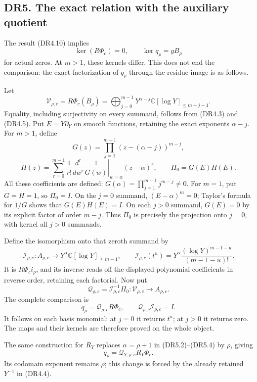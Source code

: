 \subsection{DR5. The exact relation with the auxiliary
quotient}\label{dr5.-the-exact-relation-with-the-auxiliary-quotient}

The result (DR4.10) implies \[
 \ker(R\Phi_c)=0,\qquad
 \ker q_\rho=yB_\rho
\tag{DR5.1}
\] for actual zeros. At \(m>1\), these kernels differ. This does not end
the comparison: the exact factorization of \(q_\rho\) through the
residue image is as follows.

Let \[
 \mathscr V_{\rho,c}=R\Phi_c(B_\rho)
    =\bigoplus_{j=0}^{m-1}
       Y^{\alpha-j}\mathbb C[\log Y]_{\le m-j-1}.
\tag{DR5.2}
\] Equality, including surjectivity on every summand, follows from
(DR4.3) and (DR4.5). Put \(E=Y\partial_Y\) on smooth functions,
retaining the exact exponents \(\alpha-j\). For \(m>1\), define \[
 G(z)=\prod_{j=1}^{m-1}(z-(\alpha-j))^{m-j},
\] \[
 H(z)=\sum_{r=0}^{m-1}
      \frac1{r!}\left.
          \frac{d^r}{dw^r}\frac1{G(w)}
      \right|_{w=\alpha}
      (z-\alpha)^r,\qquad
 \Pi_0=G(E)H(E).
\tag{DR5.3}
\] All these coefficients are defined: \(G(\alpha)=
\prod_{j=1}^{m-1}j^{m-j}\ne0\). For \(m=1\), put \(G=H=1\), so
\(\Pi_0=I\). On the \(j=0\) summand, \((E-\alpha)^m=0\); Taylor's
formula for \(1/G\) shows that \(G(E)H(E)=I\). On each \(j>0\) summand,
\(G(E)=0\) by its explicit factor of order \(m-j\). Thus \(\Pi_0\) is
precisely the projection onto \(j=0\), with kernel all \(j>0\) summands.

Define the isomorphism onto that zeroth summand by \[
 \mathscr I_{\rho,c}:A_{\rho,c}\longrightarrow
    Y^\alpha\mathbb C[\log Y]_{\le m-1},\qquad
 \mathscr I_{\rho,c}(t^u)
      =Y^\alpha\frac{(\log Y)^{m-1-u}}{(m-1-u)!}.
\tag{DR5.4}
\] It is \(R\Phi_c i_\rho\), and its inverse reads off the displayed
polynomial coefficients in reverse order, retaining each factorial. Now
put \[
 \mathscr Q_{\rho,c}
       =\mathscr I_{\rho,c}^{-1}\Pi_0:
       \mathscr V_{\rho,c}\longrightarrow A_{\rho,c}.
\] The complete comparison is \[
 \boxed{
 q_\rho=\mathscr Q_{\rho,c}R\Phi_c,\qquad
 \mathscr Q_{\rho,c}\mathscr I_{\rho,c}=I.
 }
\tag{DR5.5}
\] It follows on each basis monomial: at \(j=0\) it returns \(t^u\); at
\(j>0\) it returns zero. The maps and their kernels are therefore proved
on the whole object.

The same construction for \(R_Y\) replaces \(\alpha=\rho+1\) in
(DR5.2)--(DR5.4) by \(\rho\), giving \[
 q_\rho=\mathscr Q_{Y,\rho,c}R_Y\Phi_c.
\tag{DR5.6}
\] Its codomain exponent remains \(\rho\); this change is forced by the
already retained \(Y^{-1}\) in (DR4.4).


